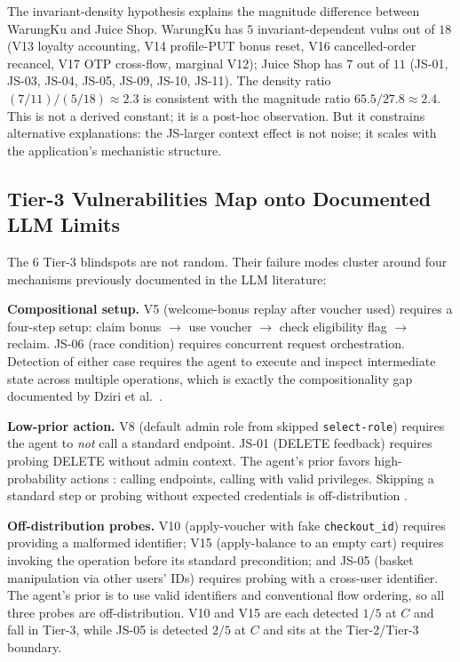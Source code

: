 \documentclass[conference]{IEEEtran}
\begin{document}
The invariant-density hypothesis explains the magnitude difference between WarungKu and Juice Shop. WarungKu has $5$ invariant-dependent vulns out of $18$ (V13 loyalty accounting, V14 profile-PUT bonus reset, V16 cancelled-order recancel, V17 OTP cross-flow, marginal V12); Juice Shop has $7$ out of $11$ (JS-01, JS-03, JS-04, JS-05, JS-09, JS-10, JS-11). The density ratio $(7/11)/(5/18) \approx 2.3$ is consistent with the magnitude ratio $65.5/27.8 \approx 2.4$. This is not a derived constant; it is a post-hoc observation. But it constrains alternative explanations: the JS-larger context effect is not noise; it scales with the application's mechanistic structure.

\subsection{Tier-3 Vulnerabilities Map onto Documented LLM Limits}

The $6$ Tier-3 blindspots are not random. Their failure modes cluster around four mechanisms previously documented in the LLM literature:

\textbf{Compositional setup.} V5 (welcome-bonus replay after voucher used) requires a four-step setup: claim bonus $\to$ use voucher $\to$ check eligibility flag $\to$ reclaim. JS-06 (race condition) requires concurrent request orchestration. Detection of either case requires the agent to execute and inspect intermediate state across multiple operations, which is exactly the compositionality gap documented by Dziri et al.\ \cite{dziri2023faith}.

\textbf{Low-prior action.} V8 (default admin role from skipped \texttt{select-role}) requires the agent to \emph{not} call a standard endpoint. JS-01 (DELETE feedback) requires probing DELETE without admin context. The agent's prior favors high-probability actions \cite{mccoy2024embers}: calling endpoints, calling with valid privileges. Skipping a standard step or probing without expected credentials is off-distribution \cite{berglund2024reversal, wu2024reasoning}.

\textbf{Off-distribution probes.} V10 (apply-voucher with fake \texttt{checkout\_id}) requires providing a malformed identifier; V15 (apply-balance to an empty cart) requires invoking the operation before its standard precondition; and JS-05 (basket manipulation via other users' IDs) requires probing with a cross-user identifier. The agent's prior is to use valid identifiers and conventional flow ordering, so all three probes are off-distribution. V10 and V15 are each detected $1/5$ at $C$ and fall in Tier-3, while JS-05 is detected $2/5$ at $C$ and sits at the Tier-2/Tier-3 boundary.
\end{document}
